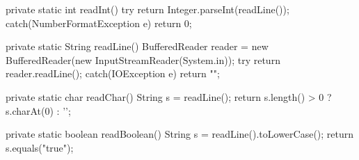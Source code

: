 private static int readInt(){
	try{
		return Integer.parseInt(readLine());
	} catch(NumberFormatException e){
		return 0;
	}
}

private static String readLine(){
	BufferedReader reader = new BufferedReader(new InputStreamReader(System.in));
	try{
		return reader.readLine();
	} catch(IOException e){
		return "";
	}
}

private static char readChar(){
	String s = readLine();
	return s.length() > 0 ? s.charAt(0) : '\0';
}

private static boolean readBoolean(){
	String s = readLine().toLowerCase();
	return s.equals("true");
}